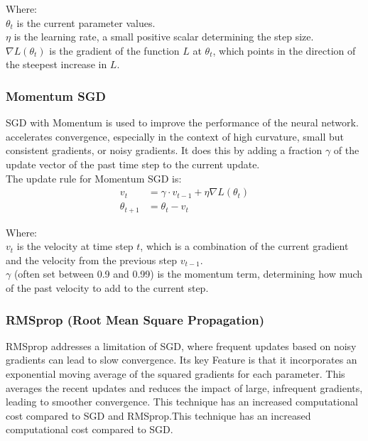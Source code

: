 \documentclass{article}
\begin{document}
\noindent\hspace*{10mm}
\begin{minipage}{\dimexpr\linewidth-20mm}
Where:\\
${\theta_t}$ is the current parameter values.\\
${\eta}$ is the learning rate, a small positive scalar determining the step size.\\
${\nabla L(\theta_t)}$ is the gradient of the function ${L}$ at ${\theta_t}$, which points in the direction of the steepest increase in ${L}$.
\end{minipage}

\subsubsection{Momentum SGD}
SGD with Momentum is used to improve the performance of the neural network. accelerates convergence, especially in the context of high curvature, small but consistent gradients, or noisy gradients. It does this by adding a fraction ${\gamma}$ of the update vector of the past time step to the current update.\\
The update rule for Momentum SGD is:
\begin{align*}
v_{t} & = \gamma \cdot v_{t-1} + \eta \nabla L(\theta_t)\\
\theta_{t+1} & = \theta_t - v_{t}
\end{align*}

\noindent\hspace*{10mm}
\begin{minipage}{\dimexpr\linewidth-20mm}
Where:\\
$v_{t}$ is the velocity at time step ${t}$, which is a combination of the current gradient and the velocity from the previous step $v_{t-1}$.\\
${\gamma}$ (often set between 0.9 and 0.99) is the momentum term, determining how much of the past velocity to add to the current step.
\end{minipage}

\subsubsection{RMSprop (Root Mean Square Propagation)}
RMSprop addresses a limitation of SGD, where frequent updates based on noisy gradients can lead to slow convergence.
Its key Feature is that it incorporates an exponential moving average of the squared gradients for each parameter. This averages the recent updates and reduces the impact of large, infrequent gradients, leading to smoother convergence. This technique has an increased computational cost compared to SGD and RMSprop.This technique has an increased computational cost compared to SGD.
\end{document}
